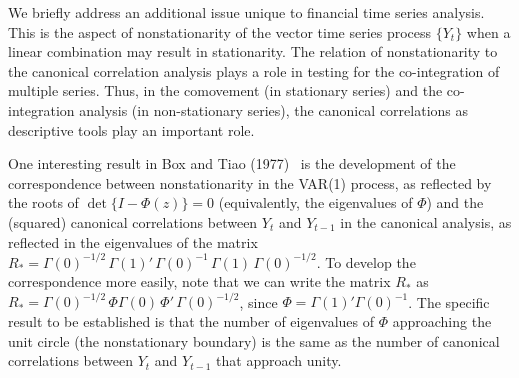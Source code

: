 We briefly address an additional issue unique to financial time series analysis.  This is the aspect of nonstationarity of the vector time series process $\{Y_t\}$ when a linear combination may result in stationarity. The relation of nonstationarity to the canonical correlation analysis plays a role in testing for the co-integration of multiple series. Thus, in the comovement (in stationary series) and the co-integration analysis (in non-stationary series), the canonical correlations as descriptive tools play an important role.


One interesting result in Box and Tiao (1977)~\cite{box77} is the development of the correspondence between nonstationarity in the VAR(1) process, as reflected by the roots of $\det \{ I - \Phi(z) \} = 0$ (equivalently, the eigenvalues of $\Phi$) and the (squared) canonical correlations between $Y_t$ and $Y_{t-1}$ in the canonical analysis, as reflected in the eigenvalues of the matrix $R_* = \Gamma(0)^{-1/2}\, \Gamma(1)' \, \Gamma(0)^{-1}\, \Gamma(1)\, \Gamma(0)^{-1/2}$. To develop the correspondence more easily, note that we can write the matrix $R_*$ as $R_* = \Gamma (0)^{-1/2}\, \Phi \Gamma(0)\, \Phi' \, \Gamma(0)^{-1/2}$, since $\Phi = \Gamma(1)' \Gamma(0)^{-1}$. The specific result to be established is that the number of eigenvalues of $\Phi$ approaching the unit circle (the nonstationary boundary) is the same as the number of canonical correlations between $Y_t$ and $Y_{t-1}$ that approach unity.  


